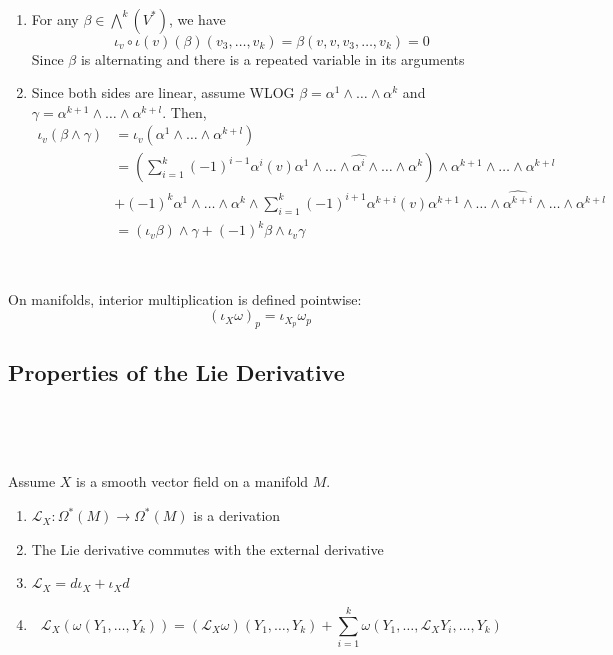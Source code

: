 \documentclass{article}
\begin{document}
\begin{customproof}
  \

  \begin{enumerate}
    \item For any $\beta \in \bigwedge^k(V^*)$, we have $$\iota_v \circ \iota(v)(\beta)(v_3, \dots, v_k) = \beta(v,v,v_3, \dots, v_k) = 0$$Since $\beta$ is alternating and there is a repeated variable in its arguments
    \item Since both sides are linear, assume WLOG $\beta = \alpha^1 \wedge \dots \wedge \alpha^k$ and $\gamma = \alpha^{k+1} \wedge \dots \wedge \alpha^{k+l}$. Then,
      \begin{align*}
        \iota_v(\beta \wedge \gamma) &= \iota_v(\alpha^1\wedge\dots\wedge\alpha^{k+l})\\
        &= (\sum_{i=1}^k (-1)^{i-1} \alpha^i(v)\alpha^1 \wedge \dots \wedge \hat{\alpha^i}\wedge\dots\wedge \alpha^k) \wedge \alpha^{k+1} \wedge \dots \wedge \alpha^{k+l} \\ &+(-1)^k \alpha^1 \wedge \dots \wedge \alpha^k \wedge \sum_{i=1}^k (-1)^{i+1} \alpha^{k+i}(v)\alpha^{k+1}\wedge \dots \wedge \hat{\alpha^{k+i}}\wedge \dots \wedge \alpha^{k+l} \\ &=(\iota_v\beta)\wedge \gamma + (-1)^k\beta\wedge\iota_v\gamma
      \end{align*}
  \end{enumerate}
\end{customproof}

\begin{definition}
  \

  On manifolds, interior multiplication is defined pointwise: $$(\iota_X \omega)_p = \iota_{X_p}\omega_p$$
\end{definition}

\subsection{Properties of the Lie Derivative}
\

\begin{theorem}
  \

  Assume $X$ is a smooth vector field on a manifold $M$.
  \begin{enumerate}
    \item $\mathcal{L}_X: \Omega^*(M) \to \Omega^*(M)$ is a derivation
    \item The Lie derivative commutes with the external derivative
    \item $\mathcal{L}_X = d\iota_X + \iota_Xd$
    \item $$\mathcal{L}_X(\omega(Y_1,\dots, Y_k)) = (\mathcal{L}_X\omega)(Y_1,\dots, Y_k) + \sum_{i=1}^k \omega(Y_1, \dots, \mathcal{L}_XY_i, \dots, Y_k)$$
  \end{enumerate}
\end{theorem}
\end{document}
